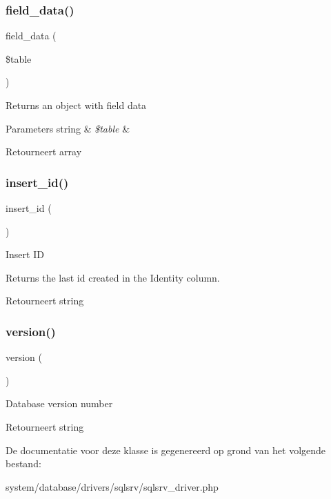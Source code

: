 \subsubsection{\texorpdfstring{field\_data()}{field\_data()}}
{\footnotesize\ttfamily field\+\_\+data (\begin{DoxyParamCaption}\item[{}]{\$table }\end{DoxyParamCaption})}

Returns an object with field data


\begin{DoxyParams}[1]{Parameters}
string & {\em \$table} & \\
\hline
\end{DoxyParams}
\begin{DoxyReturn}{Retourneert}
array 
\end{DoxyReturn}
\mbox{\label{class_c_i___d_b__sqlsrv__driver_a933f2cde8dc7f87875e257d0a4902e99}} 
\subsubsection{\texorpdfstring{insert\_id()}{insert\_id()}}
{\footnotesize\ttfamily insert\+\_\+id (\begin{DoxyParamCaption}{ }\end{DoxyParamCaption})}

Insert ID

Returns the last id created in the Identity column.

\begin{DoxyReturn}{Retourneert}
string 
\end{DoxyReturn}
\mbox{\label{class_c_i___d_b__sqlsrv__driver_a6080dae0886626b9a4cedb29240708b1}} 
\subsubsection{\texorpdfstring{version()}{version()}}
{\footnotesize\ttfamily version (\begin{DoxyParamCaption}{ }\end{DoxyParamCaption})}

Database version number

\begin{DoxyReturn}{Retourneert}
string 
\end{DoxyReturn}


De documentatie voor deze klasse is gegenereerd op grond van het volgende bestand\+:\begin{DoxyCompactItemize}
\item 
system/database/drivers/sqlsrv/sqlsrv\+\_\+driver.\+php\end{DoxyCompactItemize}
